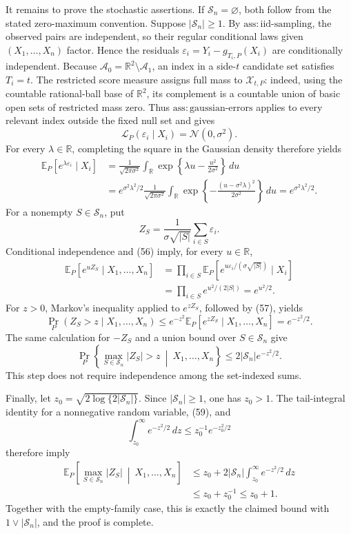 It remains to prove the stochastic assertions.  If \(\mathscr S_n=\varnothing\), both follow from the stated zero-maximum convention.  Suppose \(|\mathscr S_n|\ge1\).  By \(\mathrm{ass:iid\text{-}sampling}\), the observed pairs are independent, so their regular conditional laws given \((X_1,\ldots,X_n)\) factor.  Hence the residuals \(\varepsilon_i=Y_i-g_{T_i,P}(X_i)\) are conditionally independent.  Because \(\mathcal A_0=\mathbb R^2\setminus\mathcal A_1\), an index in a side-\(t\) candidate set satisfies \(T_i=t\).  The restricted score measure assigns full mass to \(\mathcal X_{t,P}\): indeed, using the countable rational-ball base of \(\mathbb R^2\), its complement is a countable union of basic open sets of restricted mass zero.  Thus \(\mathrm{ass:gaussian\text{-}errors}\) applies to every relevant index outside the fixed null set and gives
\[
 \mathcal L_P(\varepsilon_i\mid X_i)=\mathcal N(0,\sigma^2).
\]
For every \(\lambda\in\mathbb R\), completing the square in the Gaussian density therefore yields
\[
 \begin{aligned}
 \mathbb E_P\!\left[e^{\lambda\varepsilon_i}\mid X_i\right]
 &=\frac{1}{\sqrt{2\pi\sigma^2}}
 \int_{\mathbb R}\exp\!\left\{\lambda u-\frac{u^2}{2\sigma^2}\right\}\,du\\
 &=e^{\sigma^2\lambda^2/2}
 \frac{1}{\sqrt{2\pi\sigma^2}}
 \int_{\mathbb R}\exp\!\left\{-\frac{(u-\sigma^2\lambda)^2}{2\sigma^2}\right\}\,du
 =e^{\sigma^2\lambda^2/2}.
 \end{aligned} \tag{56}
\]
For a nonempty \(S\in\mathscr S_n\), put
\[
 Z_S=\frac{1}{\sigma\sqrt{|S|}}\sum_{i\in S}\varepsilon_i.
\]
Conditional independence and (56) imply, for every \(u\in\mathbb R\),
\[
 \begin{aligned}
 \mathbb E_P\!\left[e^{uZ_S}\mid X_1,\ldots,X_n\right]
 &=\prod_{i\in S}
 \mathbb E_P\!\left[
 e^{u\varepsilon_i/(\sigma\sqrt{|S|})}\mid X_i
 \right]\\
 &=\prod_{i\in S}e^{u^2/(2|S|)}
 =e^{u^2/2}. 
 \end{aligned} \tag{57}
\]
For \(z>0\), Markov's inequality applied to \(e^{zZ_S}\), followed by (57), yields
\[
 \Pr_P(Z_S>z\mid X_1,\ldots,X_n)
 \le e^{-z^2}\mathbb E_P[e^{zZ_S}\mid X_1,\ldots,X_n]
 =e^{-z^2/2}. \tag{58}
\]
The same calculation for \(-Z_S\) and a union bound over \(S\in\mathscr S_n\) give
\[
 \Pr_P\left\{\max_{S\in\mathscr S_n}|Z_S|>z
 \ \middle|\ X_1,\ldots,X_n\right\}
 \le2|\mathscr S_n|e^{-z^2/2}. \tag{59}
\]
This step does not require independence among the set-indexed sums.

Finally, let \(z_0=\sqrt{2\log\{2|\mathscr S_n|\}}\).  Since \(|\mathscr S_n|\ge1\), one has \(z_0>1\).  The tail-integral identity for a nonnegative random variable, (59), and
\[
 \int_{z_0}^{\infty}e^{-z^2/2}\,dz
 \le z_0^{-1}e^{-z_0^2/2}
\]
therefore imply
\[
 \begin{aligned}
 \mathbb E_P\!\left[\max_{S\in\mathscr S_n}|Z_S|
 \ \middle|\ X_1,\ldots,X_n\right]
 &\le z_0+2|\mathscr S_n|\int_{z_0}^{\infty}e^{-z^2/2}\,dz\\
 &\le z_0+z_0^{-1}\le z_0+1.
 \end{aligned}
\]
Together with the empty-family case, this is exactly the claimed bound with \(1\vee|\mathscr S_n|\), and the proof is complete.